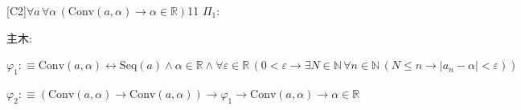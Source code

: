 \begin{fullproof}{[C2]}{$\forall a\,\forall \alpha\,(\mathrm{Conv}(a,\alpha) \to \alpha \in \mathbb{R})$}{11}\label{tree:ConvR}
\noindent$\Pi_{1}$:
\begin{ptree}
\end{ptree}
\noindent 主木:
\begin{ptree}
\noLine
{}
\end{ptree}
\begin{abbrevlist}
\item $\varphi_{1} :\equiv \mathrm{Conv}(a,\alpha) \leftrightarrow \mathrm{Seq}(a) \land \alpha \in \mathbb{R} \land \forall \varepsilon \in \mathbb{R}\,(0 < \varepsilon \to \exists N \in \mathbb{N}\,\forall n \in \mathbb{N}\,(N \leq n \to \lvert a_{n} - \alpha \rvert < \varepsilon))$
\item $\varphi_{2} :\equiv (\mathrm{Conv}(a,\alpha) \to \mathrm{Conv}(a,\alpha)) \to \varphi_{1} \to \mathrm{Conv}(a,\alpha) \to \alpha \in \mathbb{R}$
\end{abbrevlist}
\end{fullproof}

